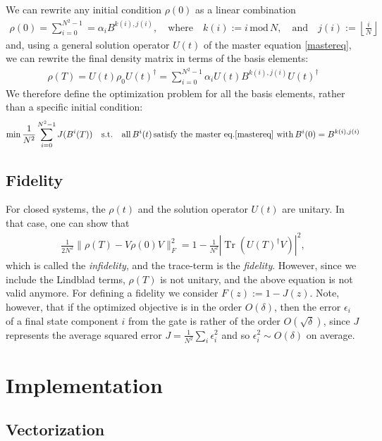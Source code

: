 \documentclass[letterpaper]{article}
\DeclareMathOperator{\Tr}{Tr}
\begin{document}
We can rewrite any initial condition $\rho(0)$ as a linear combination 
\begin{align}
  \rho(0) = \sum_{i=0}^{N^2-1} = \alpha_i B^{k(i), j(i)}, \quad \text{where} \quad k(i) := i \,\mbox{mod}\, N, \quad \text{and} \quad j(i) := \left\lfloor \frac{i}{N} \right\rfloor
\end{align}
and, using a general solution operator $U(t)$ of the master equation \eqref{mastereq}, we can rewrite the final density matrix in terms of the basis elements:
\begin{align}
  \rho(T) = U(t) \rho_0 U(t)^\dag = \sum_{i=0}^{N^2-1} \alpha_i U(t)B^{k(i), j(i)}U(t)^\dag
\end{align}
We therefore define the optimization problem for all the basis elements, rather than a specific initial condition:
\begin{align}\label{optimproblem_basis}
  \min \frac{1}{N^2}\sum_{i=0}^{N^2-1} J(B^{i}(T)) 
  \quad \text{s.t.} \quad \text{all}\, B^{i}(t) \, \text{satisfy the master eq.\eqref{mastereq} with} \, B^i(0) = B^{k(i),j(i)}
\end{align}


\subsection{Fidelity} 
For closed systems, the $\rho(t)$ and the solution operator $U(t)$ are unitary. In that case, one can show that 
\begin{align}
  \frac{1}{2N^2}\|\rho(T) - V\rho(0)V\|_F^2 = 1 - \frac{1}{N^2}|\Tr(U(T)^{\dagger}V)|^2,
\end{align}
which is called the \textit{infidelity}, and the trace-term is the \textit{fidelity}. However, since we include the Lindblad terms, $\rho(T)$ is not unitary, and the above equation is not valid anymore. For defining a fidelity we consider $F(z) := 1 - J(z)$. Note, however, that if the optimized objective is in the order $O(\delta)$, then the error $\epsilon_i$ of a final state component $i$ from the gate is rather of the order $O(\sqrt{\delta})$, since $J$ represents the average squared error $J = \frac{1}{N^2}\sum_i \epsilon_i^2$ and so $\epsilon_i^2 \sim O(\delta)$ on average.

\section{Implementation}
  \subsection{Vectorization}
\end{document}
